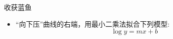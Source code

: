 \documentclass[UTF8]{ctexbeamer}
\begin{document}
\begin{frame}{收获蓝鱼}

  \begin{itemize}
  \item “向下压”曲线的右端，用最小二乘法拟合下列模型:
    \[
    \log y = mx + b
    \]
  \end{itemize}

  \begin{figure}
    \centering
    \setcounter{subfigure}{0}{}
  \end{figure}
  
\end{frame}
\end{document}
